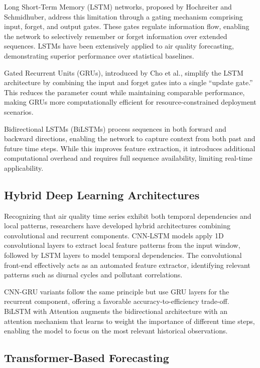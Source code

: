 Long Short-Term Memory (LSTM) networks, proposed by Hochreiter and Schmidhuber, address this limitation through a gating mechanism comprising input, forget, and output gates. These gates regulate information flow, enabling the network to selectively remember or forget information over extended sequences. LSTMs have been extensively applied to air quality forecasting, demonstrating superior performance over statistical baselines.

Gated Recurrent Units (GRUs), introduced by Cho et al., simplify the LSTM architecture by combining the input and forget gates into a single ``update gate.'' This reduces the parameter count while maintaining comparable performance, making GRUs more computationally efficient for resource-constrained deployment scenarios.

Bidirectional LSTMs (BiLSTMs) process sequences in both forward and backward directions, enabling the network to capture context from both past and future time steps. While this improves feature extraction, it introduces additional computational overhead and requires full sequence availability, limiting real-time applicability.

\subsection{Hybrid Deep Learning Architectures}

Recognizing that air quality time series exhibit both temporal dependencies and local patterns, researchers have developed hybrid architectures combining convolutional and recurrent components. CNN-LSTM models apply 1D convolutional layers to extract local feature patterns from the input window, followed by LSTM layers to model temporal dependencies. The convolutional front-end effectively acts as an automated feature extractor, identifying relevant patterns such as diurnal cycles and pollutant correlations.

CNN-GRU variants follow the same principle but use GRU layers for the recurrent component, offering a favorable accuracy-to-efficiency trade-off. BiLSTM with Attention augments the bidirectional architecture with an attention mechanism that learns to weight the importance of different time steps, enabling the model to focus on the most relevant historical observations.

\subsection{Transformer-Based Forecasting}

